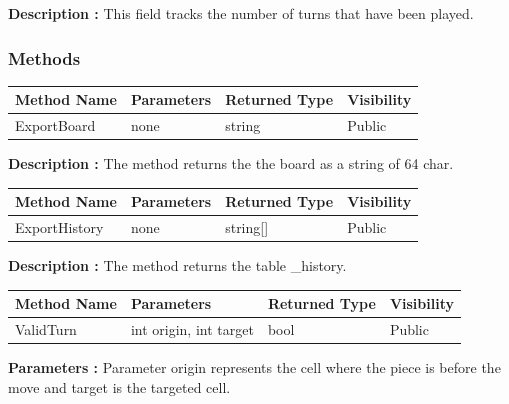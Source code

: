 \documentclass[12pt]{article}
\begin{document}
\textbf{Description :} This field tracks the number of turns that have been played.

\subsubsection{Methods}

\begin{table}[H]
    \begin{tabular}{|l|l|l|l|}
    \hline
    \rowcolor[HTML]{EFEFEF} 
    \cellcolor[HTML]{EFEFEF}\textbf{Method Name} & \textbf{Parameters}  & \textbf{Returned Type} & \textbf{Visibility} \\ \hline
    ExportBoard                                  & none                 & string                 & Public              \\ \hline
    \end{tabular}
\end{table}

\textbf{Description :} The method returns the the board as a string of 64 char.

\begin{table}[H]
    \begin{tabular}{|l|l|l|l|}
    \hline
    \rowcolor[HTML]{EFEFEF} 
    \cellcolor[HTML]{EFEFEF}\textbf{Method Name} & \textbf{Parameters}  & \textbf{Returned Type} & \textbf{Visibility} \\ \hline
    ExportHistory                                & none                 & string[]                 & Public            \\ \hline
    \end{tabular}
\end{table}

\textbf{Description :} The method returns the table \_history.

\begin{table}[H]
    \begin{tabular}{|l|l|l|l|}
    \hline
    \rowcolor[HTML]{EFEFEF} 
    \cellcolor[HTML]{EFEFEF}\textbf{Method Name} & \textbf{Parameters}    & \textbf{Returned Type} & \textbf{Visibility} \\ \hline
    ValidTurn                                    & int origin, int target & bool                   & Public              \\ \hline
    \end{tabular}
\end{table}

\textbf{Parameters :} Parameter origin represents the cell
where the piece is before the move and target is the targeted cell.
\\
\end{document}
